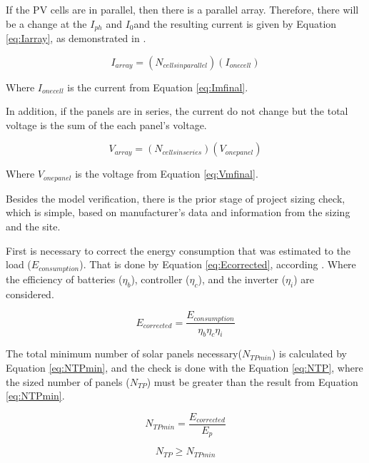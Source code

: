 \documentclass[journal]{IEEEtran}
\begin{document}
If the PV cells are in parallel, then there is a parallel array. Therefore, there will be a change at the $ I_{ph} $ and $ I_{0} $and the resulting current is given by Equation \ref{eq:Iarray}, as demonstrated in \cite{Saloux}.

\begin{equation}
\label{eq:Iarray}
I_{array} = (N_{cells in parallel})(I_{one cell})
\end{equation}

Where $ I_{one cell} $ is the current from Equation \ref{eq:Imfinal}.

In addition, if the panels are in series, the current do not change but the total voltage is the sum of the each panel's voltage.

\begin{equation}
\label{eq:Varray}
V_{array} = (N_{cells in series})(V_{one panel})
\end{equation}

Where $ V_{one panel} $ is the voltage from Equation \ref{eq:Vmfinal}.

Besides the model verification, there is the prior stage of project sizing check, which is simple, based on manufacturer's data and information from the sizing and the site. 

First is necessary to correct the energy consumption that was estimated to the load ($E_{consumption}$). That is done by Equation \ref{eq:Ecorrected}, according \cite{Pinho}. Where the efficiency of batteries ($\eta_{b}$), controller ($\eta_{c}$), and the inverter ($\eta_{i}$) are considered.

\begin{equation}
\label{eq:Ecorrected}
E_{corrected} = \dfrac{E_{consumption}}{ \eta_{b} \eta_{c} \eta_{i} }
\end{equation}

The total minimum number of solar panels necessary($ N_{TPmin} $) is calculated by Equation \ref{eq:NTPmin}, and the check is done with the Equation \ref{eq:NTP}, where the sized number of panels ($ N_{TP} $) must be greater than the result from Equation \ref{eq:NTPmin}.

\begin{equation}
\label{eq:NTPmin}
N_{TPmin} = \dfrac{E_{corrected}}{E_{p}}
\end{equation}

\begin{equation}
\label{eq:NTP}
N_{TP} \geq N_{TPmin}
\end{equation}
\end{document}
